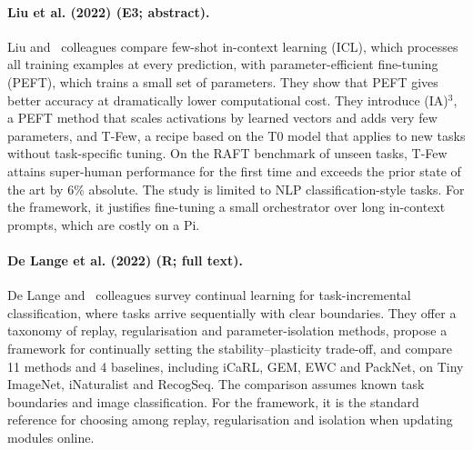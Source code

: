 \documentclass[10pt,a4paper]{article}
\begin{document}
\paragraph{Liu et al. (2022) (E3; abstract).} Liu and~\cite{Liu2022} colleagues compare few-shot in-context learning (ICL), which processes all training examples at every prediction, with parameter-efficient fine-tuning (PEFT), which trains a small set of parameters. They show that PEFT gives better accuracy at dramatically lower computational cost. They introduce (IA)$^3$, a PEFT method that scales activations by learned vectors and adds very few parameters, and T-Few, a recipe based on the T0 model that applies to new tasks without task-specific tuning. On the RAFT benchmark of unseen tasks, T-Few attains super-human performance for the first time and exceeds the prior state of the art by 6\% absolute. The study is limited to NLP classification-style tasks. For the framework, it justifies fine-tuning a small orchestrator over long in-context prompts, which are costly on a Pi.

\paragraph{De Lange et al. (2022) (R; full text).} De Lange and~\cite{DeLange2022} colleagues survey continual learning for task-incremental classification, where tasks arrive sequentially with clear boundaries. They offer a taxonomy of replay, regularisation and parameter-isolation methods, propose a framework for continually setting the stability--plasticity trade-off, and compare 11 methods and 4 baselines, including iCaRL, GEM, EWC and PackNet, on Tiny ImageNet, iNaturalist and RecogSeq. The comparison assumes known task boundaries and image classification. For the framework, it is the standard reference for choosing among replay, regularisation and isolation when updating modules online.
\end{document}
